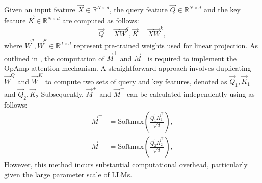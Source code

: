 Given an input feature $\vec{X} \in \mathbb{R}^{N \times d}$, the query feature $\vec{Q} \in \mathbb{R}^{N \times d}$ and the key feature $\vec{K} \in \mathbb{R}^{N \times d}$ are computed as follows:
\begin{equation}
    \vec{Q} = \vec{X}\vec{W}^q, \vec{K} = \vec{X}\vec{W}^k,
\end{equation}
where $\vec{W}^q, \vec{W}^k \in \mathbb{R}^{d \times d}$ represent pre-trained weights used for linear projection.
As outlined in , the computation of \(\vec{M}^+\) and \(\vec{M}^-\) is required to implement the OpAmp attention mechanism.
A straightforward approach involves duplicating $\vec{W}^Q$ and $\vec{W}^K$ to compute two sets of query and key features, denoted as $\vec{Q}_1, \vec{K}_1$ and $\vec{Q}_2, \vec{K}_2$
Subsequently, $\vec{M}^+$ and $\vec{M}^-$ can be calculated independently using  as follows:
\begin{align}
    \vec{M}^+ &= \mathrm{Softmax}\left(\frac{\vec{Q}_1\vec{K}_1^{\top}}{\sqrt{d}}\right), \\
    \vec{M}^- &= \mathrm{Softmax}\left(\frac{\vec{Q}_2\vec{K}_2^{\top}}{\sqrt{d}}\right),
\end{align}
However, this method incurs substantial computational overhead, particularly given the large parameter scale of LLMs. 

